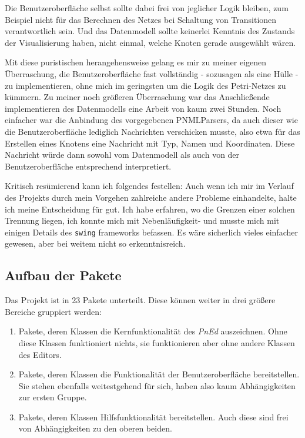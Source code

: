 \documentclass[11pt]{article}
\begin{document}
   Die Benutzeroberfläche selbst sollte dabei frei von jeglicher Logik
   bleiben, zum Beispiel nicht für das Berechnen des Netzes bei
   Schaltung von Transitionen verantwortlich sein. Und das Datenmodell
   sollte keinerlei Kenntnis des Zustands der Visualisierung haben,
   nicht einmal, welche Knoten gerade ausgewählt wären.

   Mit diese puristischen herangehensweise gelang es mir zu meiner
   eigenen Überraschung, die Benutzeroberfläche fast vollständig -
   sozusagen als eine Hülle - zu implementieren, ohne mich im
   geringsten um die Logik des Petri-Netzes zu kümmern.  Zu meiner
   noch größeren Überraschung war das Anschließende implementieren des
   Datenmodells eine Arbeit von kaum zwei Stunden.  Noch einfacher war
   die Anbindung des vorgegebenen PNMLParsers, da auch dieser wie die
   Benutzeroberfläche lediglich Nachrichten verschicken musste, also
   etwa für das Erstellen eines Knotens eine Nachricht mit Typ, Namen
   und Koordinaten.  Diese Nachricht würde dann sowohl vom Datenmodell
   als auch von der Benutzeroberfläche entsprechend interpretiert.

   Kritisch resümierend kann ich folgendes festellen: Auch wenn ich
   mir im Verlauf des Projekts durch mein Vorgehen zahlreiche andere
   Probleme einhandelte, halte ich meine Entscheidung für gut. Ich
   habe erfahren, wo die Grenzen einer solchen Trennung liegen, ich
   konnte mich mit Nebenläufigkeit- und musste mich mit einigen
   Details des \verb|swing| frameworks befassen. Es wäre sicherlich
   vieles einfacher gewesen, aber bei weitem nicht so erkenntnisreich.
\subsection{Aufbau der Pakete}
\label{sec-1-2}


   Das Projekt ist in 23 Pakete unterteilt.  Diese können weiter in
   drei größere Bereiche gruppiert werden:

\begin{enumerate}
\item Pakete, deren Klassen die Kernfunktionalität des \emph{PnEd}
      auszeichnen. Ohne diese Klassen funktioniert nichts, sie
      funktionieren aber ohne andere Klassen des Editors.
\item Pakete, deren Klassen die Funktionalität der Benutzeroberfläche
      bereitstellen.  Sie stehen ebenfalls weitestgehend für sich,
      haben also kaum Abhängigkeiten zur ersten Gruppe.
\item Pakete, deren Klassen Hilfsfunktionalität bereitstellen. Auch
      diese sind frei von Abhängigkeiten zu den oberen beiden.
\end{enumerate}
\end{document}
